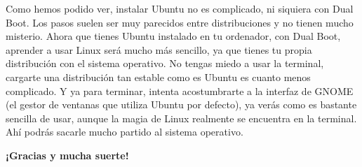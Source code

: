 \documentclass[a4paper,12pt,oneside]{book}
\begin{document}
Como hemos podido ver, instalar Ubuntu no es complicado, ni siquiera con Dual Boot. Los pasos suelen ser muy parecidos entre distribuciones y no tienen mucho misterio. Ahora que tienes Ubuntu instalado en tu ordenador, con Dual Boot, aprender a usar Linux será mucho más sencillo, ya que tienes tu propia distribución con el sistema operativo. No tengas miedo a usar la terminal, cargarte una distribución tan estable como es Ubuntu es cuanto menos complicado. Y ya para terminar, intenta acostumbrarte a la interfaz de GNOME (el gestor de ventanas que utiliza Ubuntu por defecto), ya verás como es bastante sencilla de usar, aunque la magia de Linux realmente se encuentra en la terminal. Ahí podrás sacarle mucho partido al sistema operativo.

\textbf{¡Gracias y mucha suerte!}
\end{document}
